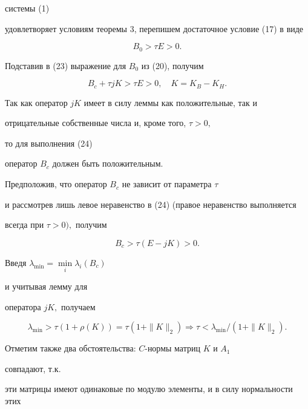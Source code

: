 системы (1) 


удовлетворяет условиям теоремы 3, перепишем достаточное условие (17) в виде 


\begin{equation} 


B_0>\tau E >0. 


\end{equation} 


Подставив в (23) выражение для $B_0$ из (20), получим 


\begin{equation} 


B_c+\tau jK>\tau E>0,\quad K=K_B-K_H. 


\end{equation} 


Так как оператор $jK$ имеет в силу леммы как положительные, так и 


отрицательные собственные числа и, кроме того, $\tau >0,$ 


то для выполнения (24) 


оператор $B_c$ должен быть положительным. 


 


Предположив, что оператор $B_c$ не зависит от параметра $\tau$ 


и рассмотрев лишь левое неравенство в (24) (правое неравенство выполняется 


всегда при $\tau >0),$ получим 


$$ 


B_c>\tau (E-jK)>0. 


$$ 


 


Введя $\lambda_{\text{min}}=\min\limits_i \lambda_i(B_c)$ 


и учитывая лемму для 


оператора $jK,$ получаем 


$$ 


\lambda_{\text{min}}>\tau (1+\rho(K))=\tau(1+\|K\|_2) \Longrightarrow 


\tau < \lambda_{\text{min}}/(1+\|K\|_2). 


$$ 


 


Отметим также два обстоятельства: $C$-нормы матриц $K$ и $A_1$ 


совпадают, т.к. 


эти матрицы имеют одинаковые по модулю элементы, и в силу нормальности этих 


